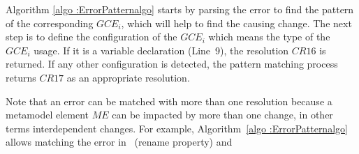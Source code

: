 
Algorithm \ref{algo :ErrorPatternalgo} starts by parsing the error to find the pattern of the corresponding $GCE_i$, which will help to find the causing change. The next step is to define the configuration of the $GCE_i$ which means the type of the $GCE_i$ usage. 
If it is a variable declaration (Line~9), the resolution $CR16$ is returned. If any other configuration is detected, the pattern matching process returns $CR17$ as an appropriate resolution.

Note that an error can be matched with more than one resolution because a metamodel element $ME$ can be impacted by more than one change, in other terms interdependent changes. 
For example, Algorithm~\ref{algo :ErrorPatternalgo} allows matching the error in~{\small{}} (rename property) and ~{\small{}}
